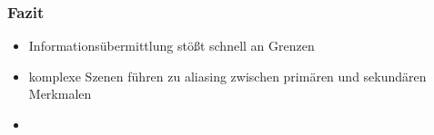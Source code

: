 \documentclass{beamer}
\begin{document}
\begin{frame}
	\frametitle{Fazit}
	\begin{itemize}
		\item Informationsübermittlung stößt schnell an Grenzen
		\item komplexe Szenen führen zu aliasing zwischen primären und sekundären Merkmalen
		\item 
	\end{itemize}
\end{frame}
\end{document}
